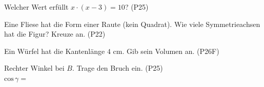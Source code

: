 \documentclass[11pt]{article}
\begin{document}
\begin{aufgabe}{Welcher Wert erfüllt $x \cdot (x - 3) = 10$? \hfill (P25) \\    }
\end{aufgabe}

\begin{aufgabe}{\begin{minipage}[t]{0.6\linewidth}Eine Fliese hat die Form einer Raute (kein Quadrat). Wie viele Symmetrieachsen hat die Figur? Kreuze an. \hfill (P22) \\      \end{minipage}\hfill\begin{minipage}[t]{0.37\linewidth}\vspace{0pt}
\end{minipage}}
\end{aufgabe}

\begin{aufgabe}{Ein Würfel hat die Kantenlänge $4$ cm. Gib sein Volumen an. \hfill (P26F) \\ \leerfeld[cm³]}
\end{aufgabe}

\begin{aufgabe}{\begin{minipage}[t]{0.6\linewidth}Rechter Winkel bei $B$. Trage den Bruch ein. \hfill (P25) \\ $\mathrm{cos}\,\gamma =$ \leerfeld\end{minipage}\hfill\begin{minipage}[t]{0.37\linewidth}\vspace{0pt}
\end{minipage}}
\end{aufgabe}

\begleitteil
{}
\end{document}
